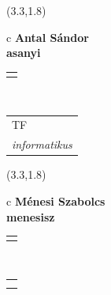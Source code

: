 \documentclass[11pt]{article}
\begin{document}
\makebox(3.3,1.8){
  \renewcommand\arraystretch{1.3}
  \begin{tabular}[c]{c}
    \hspace{8.5mm}
    \LARGE\bf{ Antal Sándor }\\
    \hspace{8.5mm}
    \Large{ asanyi }\\
    \renewcommand\arraystretch{3}
    \begin{tabular}[c]{c}
      \centering
      \fontfamily{phv}\selectfont{
        \textbf{
          \textsc{
            \scriptsize{
            \color{Dark}{ Ismerkedő }\color{Bright}{ Webmester }\color{Bright}{ Sminkmester }\color{Bright}{ Programozó }
            }
          }
        }
      }
    \end{tabular}
    \\
    \renewcommand\arraystretch{1}
    \begin{tabular}{p{3.3in}}
      \hspace{.7cm}TF\\
      \hspace{.7cm}\emph{ informatikus }\\
    \end{tabular}
  \end{tabular}
}

\makebox(3.3,1.8){
  \renewcommand\arraystretch{1.3}
  \begin{tabular}[c]{c}
    \hspace{8.5mm}
    \LARGE\bf{ Ménesi Szabolcs }\\
    \hspace{8.5mm}
    \Large{ menesisz }\\
    \renewcommand\arraystretch{3}
    \begin{tabular}[c]{c}
      \centering
      \fontfamily{phv}\selectfont{
        \textbf{
          \textsc{
            \scriptsize{
            \color{Dark}{ Ismerkedő }\color{Dark}{ Webmester }\color{Bright}{ Sminkmester }\color{Bright}{ Programozó }
            }
          }
        }
      }
    \end{tabular}
    \\
    \renewcommand\arraystretch{1}
    \begin{tabular}{p{3.3in}}
      \hspace{.7cm}\\
      \hspace{.7cm}\emph{  }\\
    \end{tabular}
  \end{tabular}
}
\end{document}
